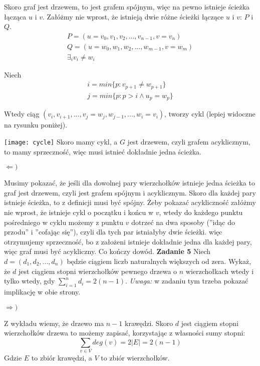 \documentclass[12pt,a4paper]{article}
\begin{document}
Skoro graf jest drzewem, to jest grafem spójnym, więc na pewno istnieje ścieżka łącząca \( u\) i \(v\). Załóżmy nie wprost, że istnieją dwie różne ścieżki łączące \( u \) i \( v \): \(P\) i \(Q\).
\begin{gather*}
	P = ( u = v_0, v_1, v_2, ... , v_{n-1}, v = v_n ) \\
	Q = ( u = w_0, w_1, w_2, ... , w_{m-1}, v = w_{m}) \\ 
	\exists_i v_i \neq w_i
\end{gather*}

Niech
\begin{gather*}
	i = min\{ p: v_{p+1} \neq w_{p+1} \} \\
	j = min\{ p: p>i \wedge u_p = w_p\}
\end{gather*}

Wtedy ciąg \( (v_i, v_{i+1}, ..., v_j = w_j, w_{j-1}, ... , w_i = v_i) \), tworzy cykl (lepiej widoczne na rysunku poniżej). 

\texttt{[image: cycle]}
Skoro mamy cykl, a \(G\) jest drzewem, czyli grafem acyklicznym, to mamy sprzeczność, więc musi istnieć dokładnie jedna ścieżka.

\( \Leftarrow ) \)

Musimy pokazać, że jeśli dla dowolnej pary wierzchołków istnieje jedna ścieżka to graf jest drzewem, czyli jest grafem spójnym i acyklicznym. Skoro dla każdej pary istnieje ścieżka, to z definicji musi być spójny. Żeby pokazać acykliczność załóżmy nie wprost, że istnieje cykl o początku i końcu w \(v\), wtedy do każdego punktu pośredniego w cyklu możemy z punktu \(v\) dotrzeć na dwa sposoby (''idąc do przodu'' i  ''cofając się''), czyli dla tych par istniałyby dwie ścieżki. więc otrzymujemy sprzeczność, bo z założeni istnieje dokładnie jedna dla każdej pary, więc graf musi być acykliczny. Co kończy dowód.
\newpage
\noindent
\textbf{Zadanie 5} Niech \( d = (d_1, d_2, ..., d_n) \) będzie ciągiem liczb naturalnych większych od zera. Wykaż, że \( d \) jest ciągiem stopni wierzchołków pewnego drzewa o \( n \) wierzchołkach wtedy i tylko wtedy, gdy \( \sum_{i=1}^n d_i = 2(n-1) \). \textit{Uwaga:} w zadaniu tym trzeba pokazać implikację w obie strony.

\( \Rightarrow ) \)

Z wykładu wiemy, że drzewo ma \( n-1 \) krawędzi. Skoro \(d\) jest ciągiem stopni wierzchołków drzewa to możemy zapisać, korzystając z własności sumy stopni:
\[
	\sum_{ v \in V} deg(v) = 2|E| = 2(n-1)
\]
Gdzie \(E\) to zbiór krawędzi, a \(V\) to zbiór wierzchołków.
\end{document}
